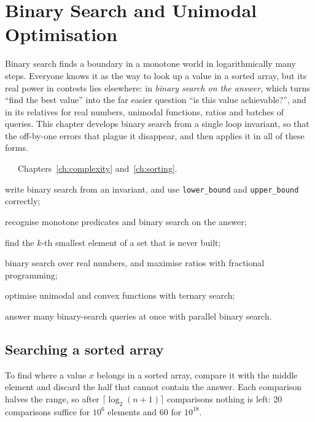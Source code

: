 \chapter{Binary Search and Unimodal Optimisation}\label{ch:binsearch}

Binary search finds a boundary in a monotone world in logarithmically many steps. Everyone knows it as the way to look up a
value in a sorted array, but its real power in contests lies elsewhere: in \emph{binary search on the answer}, which turns
``find the best value'' into the far easier question ``is this value achievable?'', and in its relatives for real numbers,
unimodal functions, ratios and batches of queries. This chapter develops binary search from a single loop invariant, so
that the off-by-one errors that plague it disappear, and then applies it in all of these forms.

\begin{chapterintro}{\bronze\ \silver\ \gold\ \ioi}{Chapters~\ref{ch:complexity} and~\ref{ch:sorting}.}
  \item write binary search from an invariant, and use \texttt{lower\_bound} and \texttt{upper\_bound} correctly;
  \item recognise monotone predicates and binary search on the answer;
  \item find the $k$-th smallest element of a set that is never built;
  \item binary search over real numbers, and maximise ratios with fractional programming;
  \item optimise unimodal and convex functions with ternary search;
  \item answer many binary-search queries at once with parallel binary search.
\end{chapterintro}

\section[Searching a sorted array]{Searching a sorted array \hfill \bronze}\label{sec:bsearch-array}

To find where a value $x$ belongs in a sorted array, compare it with the middle element and discard the half that cannot
contain the answer. Each comparison halves the range, so after $\lceil \log_2(n + 1)\rceil$ comparisons nothing is left:
20 comparisons suffice for $10^6$ elements and 60 for $10^{18}$.

